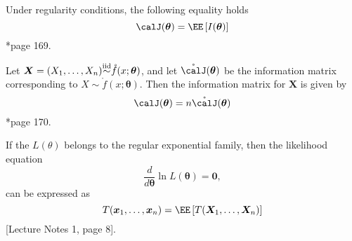 \begin{thm} \label{thm: fim_and_oim}
    Under regularity conditions, the following equality holds
    \begin{equation*}
        \calJ (\bm{\theta}) = \EE \left[ I (\bm{\theta}) \right]
    \end{equation*}
    \cite{KroeseDirkP2013SMaC}*{page 169}.
\end{thm}

\begin{thm} \label{thm: fim_iid}
    Let $\bm{X} = (X_1 , \ldots , X_n) {\overset{\text{iid}}{\sim}} \mathring{f} (x ; \bm{\theta})$, and let $\mathring{\calJ} (\bm{\theta})$ be the information matrix corresponding to $X \sim \mathring{f} (x ; \bm{\theta})$. Then the information matrix for $\bm{X}$ is given by
    \begin{equation*}
        \calJ (\bm{\theta}) = n \mathring{\calJ} (\bm{\theta})
    \end{equation*}
    \cite{KroeseDirkP2013SMaC}*{page 170}.
\end{thm}

\begin{thm} \label{thm: ll_rc}
    If the $L (\theta)$ belongs to the regular exponential family, then the likelihood equation
    \begin{equation*}
        \frac{d}{d \bm{\theta}} \ln L (\bm{\theta}) = \bm{0},
    \end{equation*}
    can be expressed as
    \begin{equation*}
        T (\bm{x}_1 , \ldots , \bm{x}_n) = \EE \left[ T (\bm{X}_1 , \ldots , \bm{X}_n) \right]
    \end{equation*}
    [Lecture Notes 1, page 8].
\end{thm}